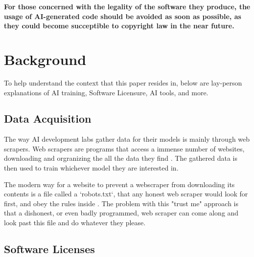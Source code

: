 \documentclass[journal]{IEEEtran}
\begin{document}
\textbf {
  For those concerned with the legality of the software they produce, the usage of
AI-generated code should be avoided as soon as possible, as they could become succeptible to
copyright law in the near future.
}

\section{Background}

To help understand the context that this paper resides in, below are
lay-person explanations of AI training, Software Licensure, AI tools, and
more.

\subsection{Data Acquisition}

The way AI development labs gather data for their models is
mainly through web scrapers. Web scrapers are programs that access a
immense number of websites, downloading and orgranizing
the all the data they find \cite{Miquido}. The gathered data
is then used to train whichever model they are interested in. 

The modern way for a website to prevent a webscraper from
downloading its contents is a file called a `robots.txt`,
that any honest web scraper would look for first, and obey
the rules inside \cite{robots}. The problem with this "trust me" approach
is that a dishonest, or even badly programmed, web scraper
can come along and look past this file and do whatever they please\cite{robots}.



\subsection{Software Licenses}

\end{document}
